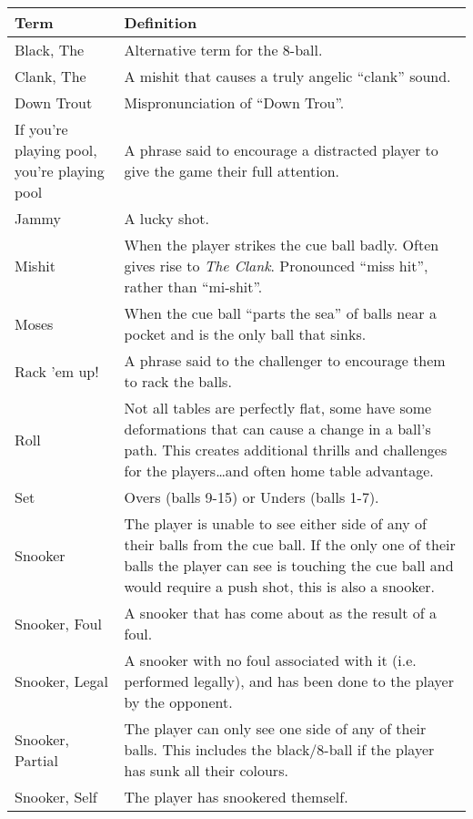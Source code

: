 \small
\begin{center}
    \begin{tabular}{  p{}  p{}  } 
      \hline
      \textbf{Term} & \textbf{Definition} \\ \hline
      Black, The & Alternative term for the 8-ball. \\ \hline
      Clank, The & A mishit that causes a truly angelic “clank” sound. \\ \hline
      Down Trout & Mispronunciation of “Down Trou”. \\ \hline
      If you're playing pool, you're playing pool & A phrase said to encourage a distracted player to give the game their full attention. \\ \hline
      Jammy & A lucky shot. \\ \hline
      Mishit & When the player strikes the cue ball badly. Often gives rise to \emph{The Clank}. Pronounced “miss hit”, rather than “mi-shit”.\\ \hline
      Moses & When the cue ball “parts the sea” of balls near a pocket and is the only ball that sinks. \\ \hline
      Rack 'em up! & A phrase said to the challenger to encourage them to rack the balls. \\ \hline
      Roll & Not all tables are perfectly flat, some have some deformations that can cause a change in a ball's path. This creates additional thrills and challenges for the players\dots and often home table advantage.\\ \hline
      Set & Overs (balls 9-15) or Unders (balls 1-7). \\ \hline
      Snooker & The player is unable to see either side of any of their balls from the cue ball. If the only one of their balls the player can see is touching the cue ball and would require a push shot, this is also a snooker.\\ \hline
      Snooker, Foul & A snooker that has come about as the result of a foul. \\ \hline
      Snooker, Legal & A snooker with no foul associated with it (i.e. performed legally), and has been done to the player by the opponent. \\ \hline
      Snooker, Partial & The player can only see one side of any of their balls. This includes the black/8-ball if the player has sunk all their colours. \\ \hline
      Snooker, Self & The player has snookered themself. \\ \hline

\end{tabular}
\end{center}
